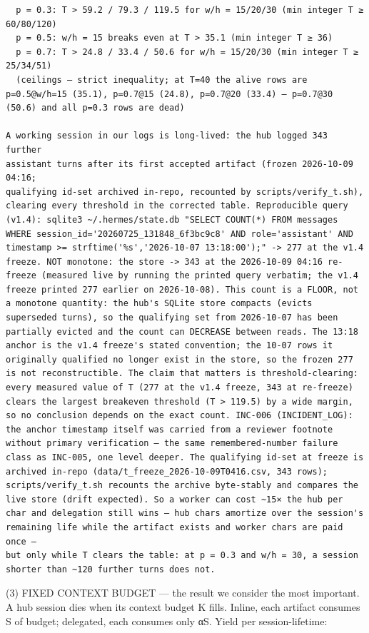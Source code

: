 \documentclass[
]{article}
\begin{document}
\begin{verbatim}
  p = 0.3: T > 59.2 / 79.3 / 119.5 for w/h = 15/20/30 (min integer T ≥ 60/80/120)
  p = 0.5: w/h = 15 breaks even at T > 35.1 (min integer T ≥ 36)
  p = 0.7: T > 24.8 / 33.4 / 50.6 for w/h = 15/20/30 (min integer T ≥ 25/34/51)
  (ceilings — strict inequality; at T=40 the alive rows are p=0.5@w/h=15 (35.1), p=0.7@15 (24.8), p=0.7@20 (33.4) — p=0.7@30 (50.6) and all p=0.3 rows are dead)

A working session in our logs is long-lived: the hub logged 343 further
assistant turns after its first accepted artifact (frozen 2026-10-09 04:16;
qualifying id-set archived in-repo, recounted by scripts/verify_t.sh),
clearing every threshold in the corrected table. Reproducible query (v1.4): sqlite3 ~/.hermes/state.db "SELECT COUNT(*) FROM messages WHERE session_id='20260725_131848_6f3bc9c8' AND role='assistant' AND timestamp >= strftime('%s','2026-10-07 13:18:00');" -> 277 at the v1.4 freeze. NOT monotone: the store -> 343 at the 2026-10-09 04:16 re-freeze (measured live by running the printed query verbatim; the v1.4 freeze printed 277 earlier on 2026-10-08). This count is a FLOOR, not a monotone quantity: the hub's SQLite store compacts (evicts superseded turns), so the qualifying set from 2026-10-07 has been partially evicted and the count can DECREASE between reads. The 13:18 anchor is the v1.4 freeze's stated convention; the 10-07 rows it originally qualified no longer exist in the store, so the frozen 277 is not reconstructible. The claim that matters is threshold-clearing: every measured value of T (277 at the v1.4 freeze, 343 at re-freeze) clears the largest breakeven threshold (T > 119.5) by a wide margin, so no conclusion depends on the exact count. INC-006 (INCIDENT_LOG): the anchor timestamp itself was carried from a reviewer footnote without primary verification — the same remembered-number failure class as INC-005, one level deeper. The qualifying id-set at freeze is archived in-repo (data/t_freeze_2026-10-09T0416.csv, 343 rows); scripts/verify_t.sh recounts the archive byte-stably and compares the live store (drift expected). So a worker can cost ~15× the hub per
char and delegation still wins — hub chars amortize over the session's
remaining life while the artifact exists and worker chars are paid once —
but only while T clears the table: at p = 0.3 and w/h = 30, a session
shorter than ~120 further turns does not.
\end{verbatim}

(3) FIXED CONTEXT BUDGET --- the result we consider the most important.
A hub session dies when its context budget K fills. Inline, each
artifact consumes S of budget; delegated, each consumes only αS. Yield
per session-lifetime:
\end{document}
